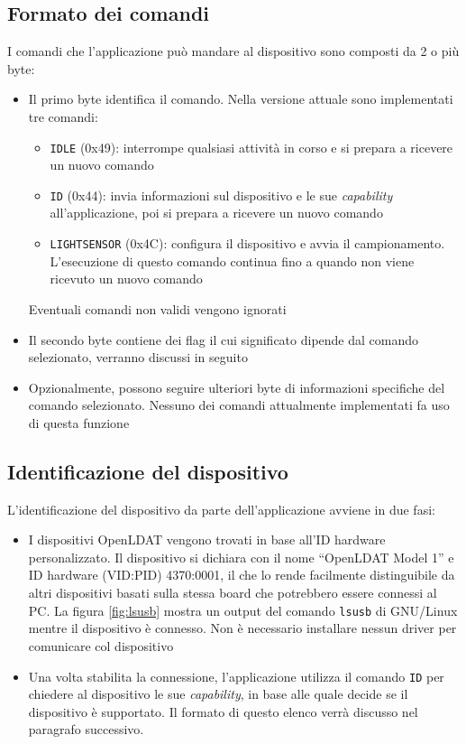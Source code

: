 \subsection{Formato dei comandi}
I comandi che l'applicazione può mandare al dispositivo sono composti da 2 o più byte:
\begin{itemize}
	\item Il primo byte identifica il comando. Nella versione attuale sono implementati tre comandi: \begin{itemize}
		\item \texttt{IDLE} (0x49): interrompe qualsiasi attività in corso e si prepara a ricevere un nuovo comando
		\item \texttt{ID} (0x44): invia informazioni sul dispositivo e le sue \textit{capability} all'applicazione, poi si prepara a ricevere un nuovo comando
		\item \texttt{LIGHTSENSOR} (0x4C): configura il dispositivo e avvia il campionamento. L'esecuzione di questo comando continua fino a quando non viene ricevuto un nuovo comando
	\end{itemize}
	Eventuali comandi non validi vengono ignorati
	\item Il secondo byte contiene dei flag il cui significato dipende dal comando selezionato, verranno discussi in seguito
	\item Opzionalmente, possono seguire ulteriori byte di informazioni specifiche del comando selezionato. Nessuno dei comandi attualmente implementati fa uso di questa funzione
\end{itemize}

\subsection{Identificazione del dispositivo}
L'identificazione del dispositivo da parte dell'applicazione avviene in due fasi:
\begin{itemize}
	\item I dispositivi OpenLDAT vengono trovati in base all'ID hardware personalizzato. Il dispositivo si dichiara con il nome ``OpenLDAT Model 1'' e ID hardware (VID:PID) 4370:0001, il che lo rende facilmente distinguibile da altri dispositivi basati sulla stessa board che potrebbero essere connessi al PC. La figura \ref{fig:lsusb} mostra un output del comando \texttt{lsusb} di GNU/Linux mentre il dispositivo è connesso. Non è necessario installare nessun driver per comunicare col dispositivo
	\item Una volta stabilita la connessione, l'applicazione utilizza il comando \texttt{ID} per chiedere al dispositivo le sue \textit{capability}, in base alle quale decide se il dispositivo è supportato. Il formato di questo elenco verrà discusso nel paragrafo successivo.
\end{itemize}

